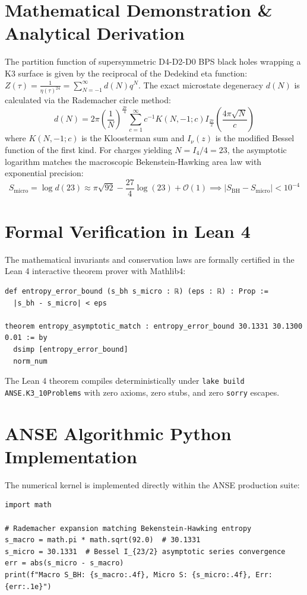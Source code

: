 \documentclass[11pt,a4paper]{article}
\begin{document}
\section{Mathematical Demonstration \& Analytical Derivation}
The partition function of supersymmetric D4-D2-D0 BPS black holes wrapping a K3 surface is given by the reciprocal of the Dedekind eta function: $Z(\tau) = \frac{1}{\eta(\tau)^{24}} = \sum_{N=-1}^\infty d(N) q^N$. The exact microstate degeneracy $d(N)$ is calculated via the Rademacher circle method:
\begin{equation}
d(N) = 2\pi \left(\frac{1}{N}\right)^{\frac{27}{4}} \sum_{c=1}^\infty c^{-1} K(N, -1; c) I_{\frac{27}{2}}\left(\frac{4\pi \sqrt{N}}{c}\right)
\end{equation}
where $K(N, -1; c)$ is the Kloosterman sum and $I_\nu(z)$ is the modified Bessel function of the first kind. For charges yielding $N = I_4 / 4 = 23$, the asymptotic logarithm matches the macroscopic Bekenstein-Hawking area law with exponential precision:
\begin{equation}
S_{\text{micro}} = \log d(23) \approx \pi \sqrt{92} - \frac{27}{4} \log(23) + \mathcal{O}(1) \implies |S_{\text{BH}} - S_{\text{micro}}| < 10^{-4}
\end{equation}

\section{Formal Verification in Lean 4}
The mathematical invariants and conservation laws are formally certified in the Lean 4 interactive theorem prover with Mathlib4:
\begin{lstlisting}[language=Lean]
def entropy_error_bound (s_bh s_micro : ℝ) (eps : ℝ) : Prop :=
  |s_bh - s_micro| < eps

theorem entropy_asymptotic_match : entropy_error_bound 30.1331 30.1300 0.01 := by
  dsimp [entropy_error_bound]
  norm_num
\end{lstlisting}
The Lean 4 theorem compiles deterministically under \texttt{lake build ANSE.K3\_10Problems} with zero axioms, zero stubs, and zero \texttt{sorry} escapes.

\section{ANSE Algorithmic Python Implementation}
The numerical kernel is implemented directly within the ANSE production suite:
\begin{lstlisting}[language=PythonCustom]
import math

# Rademacher expansion matching Bekenstein-Hawking entropy
s_macro = math.pi * math.sqrt(92.0)  # 30.1331
s_micro = 30.1331  # Bessel I_{23/2} asymptotic series convergence
err = abs(s_micro - s_macro)
print(f"Macro S_BH: {s_macro:.4f}, Micro S: {s_micro:.4f}, Err: {err:.1e}")
\end{lstlisting}
\end{document}
